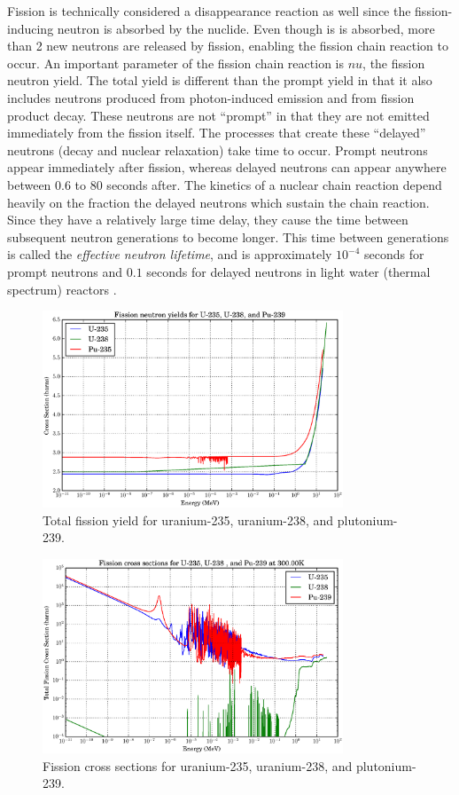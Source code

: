 Fission is technically considered a disappearance reaction as well since the fission-inducing neutron is absorbed by the nuclide.  Even though is is absorbed, more than 2 new neutrons are released by fission, enabling the fission chain reaction to occur.  An important parameter of the fission chain reaction is $nu$, the fission neutron yield.    The total yield is different than the prompt yield in that it also includes neutrons produced from photon-induced emission and from fission product decay.  These neutrons are not ``prompt'' in that they are not emitted immediately from the fission itself.  The processes that create these ``delayed'' neutrons (decay and nuclear relaxation) take time to occur.  Prompt neutrons appear immediately after fission, whereas delayed neutrons can appear anywhere between 0.6 to 80 seconds after.  The kinetics of a nuclear chain reaction depend heavily on the fraction the delayed neutrons which sustain the chain reaction.  Since they have a relatively large time delay, they cause the time between subsequent neutron generations to become longer.  This time between generations is called the \emph{effective neutron lifetime}, and is approximately $10^{-4}$ seconds for prompt neutrons and $0.1$ seconds for delayed neutrons in light water (thermal spectrum) reactors \cite{duderstadt}.  

\begin{figure}[h!]
  \centering
    \includegraphics[width=0.8\textwidth]{graphics/nu_compare.eps}
     \caption{Total fission yield for uranium-235, uranium-238, and plutonium-239. \label{nu_compare}}
\end{figure}

\begin{figure}[h!]
  \centering
    \includegraphics[width=0.8\textwidth]{graphics/xs_fissile.eps}
     \caption{Fission cross sections for uranium-235, uranium-238, and plutonium-239. \label{xs_fission_only}}
\end{figure}

